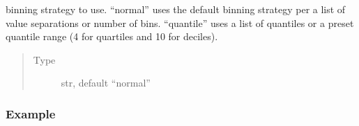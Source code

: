 \documentclass[letterpaper,10pt,english]{sphinxmanual}
\begin{document}
\begin{fulllineitems}
\begin{fulllineitems}
\begin{quote}
\begin{description}
\end{description}\end{quote}

\end{fulllineitems}


\begin{fulllineitems}
\label{\detokenize{dalio.pipe:dalio.pipe.col_generation.Bin.bin_strat}}
binning strategy to use. “normal”
uses the default binning strategy per a list of value separations
or number of bins. “quantile” uses a list of quantiles or a
preset quantile range (4 for quartiles and 10 for deciles).
\begin{quote}\begin{description}
\item[{Type}] \leavevmode
str, default “normal”

\end{description}\end{quote}

\end{fulllineitems}

\subsubsection*{Example}


\end{fulllineitems}
\end{document}
